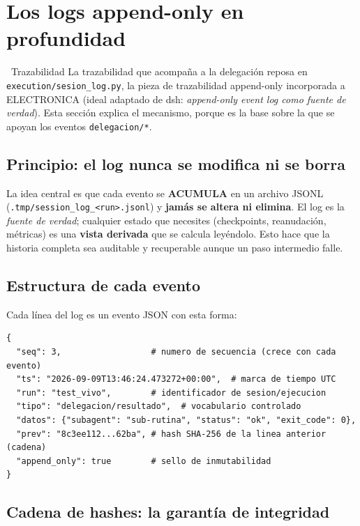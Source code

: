 \documentclass[11pt,a4paper]{article}
\newcommand{\iconotexto}[2]{\textcolor{cyanNeon}{\faIcon{#1}}~#2}
\begin{document}
\section{Los logs append-only en profundidad}

\iconotexto{stream}{Trazabilidad} La trazabilidad que acompaña a la delegación reposa en
\texttt{execution/sesion\_log.py}, la pieza de trazabilidad append-only incorporada a
ELECTRONICA (ideal adaptado de dsh: \emph{append-only event log como fuente de verdad}).
Esta sección explica el mecanismo, porque es la base sobre la que se apoyan los eventos
\texttt{delegacion/*}.

\subsection{Principio: el log nunca se modifica ni se borra}

La idea central es que cada evento se \textbf{ACUMULA} en un archivo JSONL
(\texttt{.tmp/session\_log\_<run>.jsonl}) y \textbf{jamás se altera ni elimina}. El log
es la \emph{fuente de verdad}; cualquier estado que necesites (checkpoints, reanudación,
métricas) es una \textbf{vista derivada} que se calcula leyéndolo. Esto hace que la
historia completa sea auditable y recuperable aunque un paso intermedio falle.

\subsection{Estructura de cada evento}

Cada línea del log es un evento JSON con esta forma:

\begin{lstlisting}[style=estiloPython]
{
  "seq": 3,                  # numero de secuencia (crece con cada evento)
  "ts": "2026-09-09T13:46:24.473272+00:00",  # marca de tiempo UTC
  "run": "test_vivo",        # identificador de sesion/ejecucion
  "tipo": "delegacion/resultado",  # vocabulario controlado
  "datos": {"subagent": "sub-rutina", "status": "ok", "exit_code": 0},
  "prev": "8c3ee112...62ba", # hash SHA-256 de la linea anterior (cadena)
  "append_only": true        # sello de inmutabilidad
}
\end{lstlisting}

\subsection{Cadena de hashes: la garantía de integridad}
\end{document}
